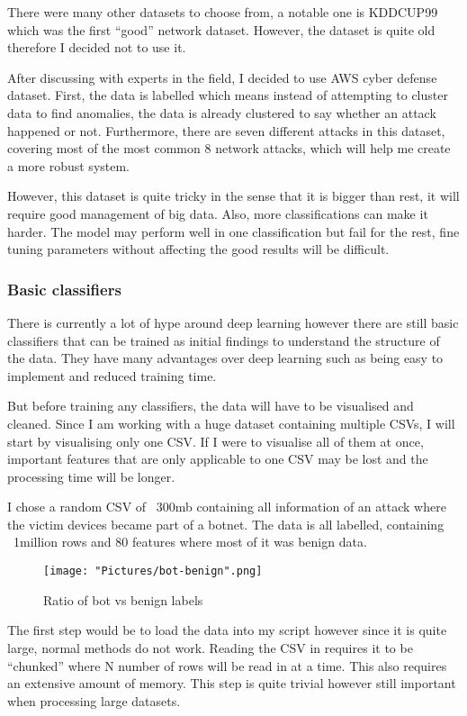 \documentclass[11pt]{article}
\begin{document}
There were many other datasets to choose from, a notable one is KDDCUP99 \cite{bg-dataset-kdd99} which was the first “good” network dataset. However, the dataset is quite old therefore I decided not to use it. 

After discussing with experts in the field, I decided to use AWS cyber defense dataset. First, the data is labelled which means instead of attempting to cluster data to find anomalies, the data is already clustered to say whether an attack happened or not. Furthermore, there are seven different attacks in this dataset, covering most of the most common 8 network attacks, which will help me create a more robust system. 

However, this dataset is quite tricky in the sense that it is bigger than rest, it will require good management of big data. Also, more classifications can make it harder. The model may perform well in one classification but fail for the rest, fine tuning parameters without affecting the good results will be difficult. 

\subsubsection{Basic classifiers}
There is currently a lot of hype around deep learning however there are still basic classifiers that can be trained as initial findings to understand the structure of the data. They have many advantages over deep learning such as being easy to implement and reduced training time. 

But before training any classifiers, the data will have to be visualised and cleaned. Since I am working with a huge dataset containing multiple CSVs, I will start by visualising only one CSV. If I were to visualise all of them at once, important features that are only applicable to one CSV may be lost and the processing time will be longer. 

I chose a random CSV of ~300mb containing all information of an attack where the victim devices became part of a botnet. The data is all labelled, containing ~1million rows and 80 features where most of it was benign data.

\begin{figure}[h!]
   \texttt{[image: "Pictures/bot-benign".png]}
   \caption{Ratio of bot vs benign labels}
   \label{fig:nans}
\end{figure}

 
The first step would be to load the data into my script however since it is quite large, normal methods do not work. Reading the CSV in requires it to be “chunked” where N number of rows will be read in at a time. This also requires an extensive amount of memory. This step is quite trivial however still important when processing large datasets.
\end{document}
